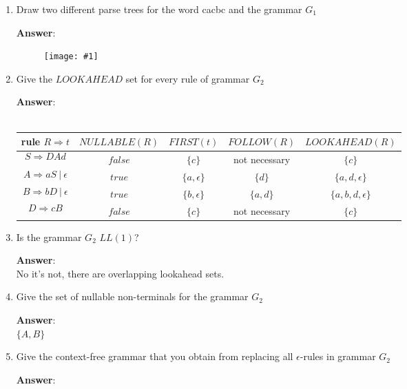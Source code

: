\documentclass[a4paper, 14pt]{report}
\newcommand{\centeredimg}[1]{%
	\begin{figure}[h]
		\begin{center}
			\texttt{[image: \#1]}
		\end{center}
\end{figure}}
\newcommand{\answer}[1]{%
	\textbf{Answer}:\\
#1}
\begin{document}
\begin{enumerate}[label=(\alph*)]
	\setlength\itemsep{2em}

\item Draw two different parse trees for the word cacbc and the grammar $G_{1}$

	\answer{\centeredimg{parse_trees.jpg}}

\item Give the $LOOKAHEAD$ set for every rule of grammar $G_{2}$

	\answer{%
		\\
		\begin{tabular}{ |c|c|c|c|c| }
			\hline
			rule $R \Rightarrow t$ & $NULLABLE(R)$ & $FIRST(t)$ & $FOLLOW(R)$ & $LOOKAHEAD(R)$ \\
			\hline
			\[ S \Rightarrow DAd \] & $false$ & $\{c\}$ & not necessary & $\{c\} $ \\
			\hline
			\[ A \Rightarrow aS\ |\ \epsilon \] & $true$  & $\{a, \epsilon\}$ & $\{d\}$ & $\{a, d, \epsilon\}$  \\
			\hline 
			\[ B \Rightarrow bD\ |\ \epsilon \] & $true$ & $\{b, \epsilon\}$ & $\{a, d\}$ & $\{a, b, d, \epsilon\}$ \\ 
			\hline
			\[ D \Rightarrow cB \] &$false$ & $\{c\}$ & not necessary & $\{c\}$ \\
			\hline
	\end{tabular}}

\item Is the grammar $G_{2}$ $LL(1)$?

	\answer{No it's not, there are overlapping lookahead sets.}

\item Give the set of nullable non-terminals for the grammar $G_{2}$

	\answer{$\{A, B\}$}

\item Give the context-free grammar that you obtain from replacing all $\epsilon$-rules in grammar $G_{2}$

	\answer{%

		\begin{multicols}{2}

			\begin{center} 


\end{center}
\end{multicols}}
\end{enumerate}
\end{document}
